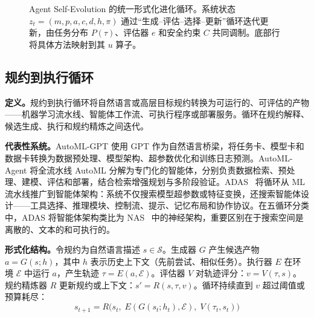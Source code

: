 \begin{figure}[htbp]
\caption{Agent Self-Evolution 的统一形式化进化循环。系统状态 $z_t=(m,p,a,c,d,h,\pi)$ 通过``生成--评估--选择--更新''循环迭代更新，由任务分布 $P(\tau)$、评估器 $e$ 和安全约束 $C$ 共同调制。底部行将具体方法映射到其 $u$ 算子。}
\label{fig:ch2-evolution-loop}
\end{figure}

\subsection{规约到执行循环}\label{sec:ch2-spec-loop}

\textbf{定义。}规约到执行循环将自然语言或高层目标规约转换为可运行的、可评估的产物——机器学习流水线、智能体工作流、可执行程序或部署服务。循环在规约解释、候选生成、执行和规约精炼之间迭代。

\textbf{代表性系统。}AutoML-GPT 使用 GPT 作为自然语言桥梁，将任务卡、模型卡和数据卡转换为数据预处理、模型架构、超参数优化和训练日志预测。AutoML-Agent 将全流水线 AutoML 分解为专门化的智能体，分别负责数据检索、预处理、建模、评估和部署，结合检索增强规划与多阶段验证。ADAS~\cite{adas2025} 将循环从 ML 流水线推广到智能体架构：系统不仅搜索模型超参数或特征变换，还搜索智能体设计——工具选择、推理模块、控制流、提示、记忆布局和协作协议。在五循环分类中，ADAS 将智能体架构类比为 NAS~\cite{zoph2018learning,liu2018darts} 中的神经架构，重要区别在于搜索空间是离散的、文本的和可执行的。

\textbf{形式化结构。}令规约为自然语言描述 $s \in \mathcal{S}$。生成器 $G$ 产生候选产物 $a = G(s; h)$，其中 $h$ 表示历史上下文（先前尝试、相似任务）。执行器 $E$ 在环境 $\mathcal{E}$ 中运行 $a$，产生轨迹 $\tau = E(a, \mathcal{E})$。评估器 $V$ 对轨迹评分：$v = V(\tau, s)$。规约精炼器 $R$ 更新规约或上下文：$s' = R(s, \tau, v)$。循环持续直到 $v$ 超过阈值或预算耗尽：
\begin{equation}\label{eq:ch2-spec-loop}
s_{t+1} = R\big(s_t,\; E(G(s_t; h_t), \mathcal{E}),\; V(\tau_t, s_t)\big)
\end{equation}


